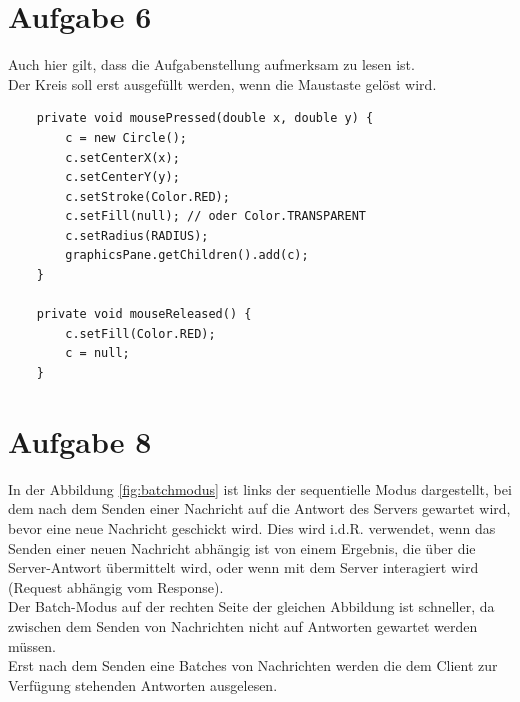 \section{Aufgabe 6}
Auch hier gilt, dass die Aufgabenstellung aufmerksam zu lesen ist.\\
Der Kreis soll erst ausgefüllt werden, wenn die Maustaste gelöst wird.

\begin{verbatim}
    private void mousePressed(double x, double y) {
        c = new Circle();
        c.setCenterX(x);
        c.setCenterY(y);
        c.setStroke(Color.RED);
        c.setFill(null); // oder Color.TRANSPARENT
        c.setRadius(RADIUS);
        graphicsPane.getChildren().add(c);
    }

    private void mouseReleased() {
        c.setFill(Color.RED);
        c = null;
    }
\end{verbatim}

\section{Aufgabe 8}\label{sec:ss19_aufgabe8}

In der Abbildung \ref{fig:batchmodus} ist links der sequentielle Modus dargestellt, bei dem nach dem Senden einer Nachricht auf die Antwort des Servers gewartet wird, bevor eine neue Nachricht geschickt wird.
Dies wird i.d.R. verwendet, wenn das Senden einer neuen Nachricht abhängig ist von einem Ergebnis, die über die Server-Antwort übermittelt wird, oder wenn mit dem Server interagiert wird (Request abhängig vom Response).\\
Der Batch-Modus auf der rechten Seite der gleichen Abbildung ist schneller, da zwischen dem Senden von Nachrichten nicht auf Antworten gewartet werden müssen. \\
Erst nach dem Senden eine Batches von Nachrichten werden die dem Client zur Verfügung stehenden Antworten ausgelesen.\\

